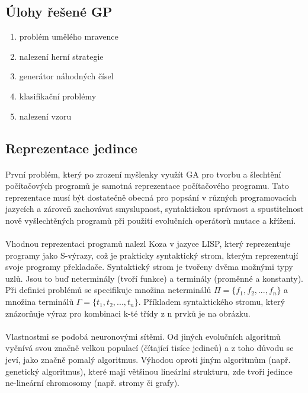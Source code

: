 \documentclass[bc,male,java,dept460]{diploma}		%
\begin{document}
\subsection{Úlohy řešené GP}
\begin{enumerate}
\item problém umělého mravence
\item nalezení herní strategie
\item generátor náhodných čísel
\item klasifikační problémy
\item nalezení vzoru
\end{enumerate}

\subsection{Reprezentace jedince}
\paragraph*{}
První problém, který po zrození myšlenky využít GA pro tvorbu a šlechtění počítačových programů je samotná reprezentace počítačového programu. Tato reprezentace musí být dostatečně obecná pro popsání v různých programovacích jazycích a zároveň zachovávat smyslupnost, syntaktickou správnost a spustitelnost nově vyšlechtěných programů při použití evolučních operátorů mutace a křížení.

\paragraph*{}
Vhodnou reprezentaci programů nalezl Koza v jazyce LISP, který reprezentuje programy jako S-výrazy, což je prakticky syntaktický strom, kterým reprezentují svoje programy překladače. Syntaktický strom je tvořeny dvěma možnými typy uzlů. Jsou to buď neterminály (tvoří funkce) a terminály (proměnné a konstanty). Při definici problémů se specifikuje množina neterminálů $\Pi=\{f_1,f_2,...,f_n\}$ a množina terminálů $\Gamma=\{t_1,t_2,...,t_n\}$. Příkladem syntaktického stromu, který znázorňuje výraz pro kombinaci k-té třídy z n prvků je na obrázku.

\paragraph*{}
Vlastnostmi se podobá neuronovými sítěmi. Od jiných evolučních algoritmů vyčnívá svou značně velkou populací (čítající tisíce jedinců) a z toho důvodu se jeví, jako značně pomalý algoritmus. Výhodou oproti jiným algoritmům (např. genetický algoritmus), které mají většinou lineárlní strukturu, zde tvoři jedince ne-lineární chromosomy (např. stromy či grafy).
\end{document}
